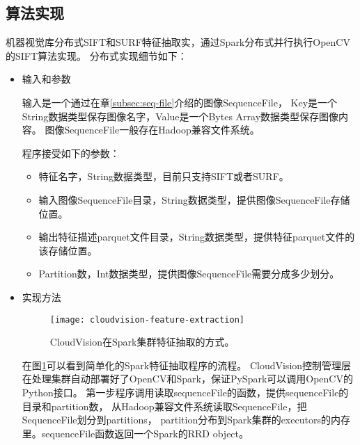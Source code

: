 \subsection*{算法实现}
机器视觉库分布式SIFT和SURF特征抽取实，通过Spark分布式并行执行OpenCV的SIFT算法实现。
分布式实现细节如下：
\begin{itemize}
  \item 输入和参数

        输入是一个通过在章\ref{subsec:seq-file}介绍的图像SequenceFile，
        Key是一个String数据类型保存图像名字，Value是一个Bytes Array数据类型保存图像内容。
        图像SequenceFile一般存在Hadoop兼容文件系统。

        程序接受如下的参数：
        \begin{itemize}
            \item 特征名字，String数据类型，目前只支持SIFT或者SURF。
            \item 输入图像SequenceFile目录，String数据类型，提供图像SequenceFile存储位置。
            \item 输出特征描述parquet文件目录，String数据类型，提供特征parquet文件的该存储位置。
            \item Partition数，Int数据类型，提供图像SequenceFile需要分成多少划分。
        \end{itemize}

  \item 实现方法

        \begin{figure}[h]
          \centering
            \texttt{[image: cloudvision-feature-extraction]}
          \caption{CloudVision在Spark集群特征抽取的方式。}
          \label{fig:cloudvision-feature-extraction}
        \end{figure}

        在图\ref{fig:cloudvision-feature-extraction}可以看到简单化的Spark特征抽取程序的流程。
        CloudVision控制管理层在处理集群自动部署好了OpenCV和Spark，保证PySpark可以调用OpenCV的
        Python接口。
        第一步程序调用读取sequenceFile的函数，提供sequenceFile的目录和partition数，
        从Hadoop兼容文件系统读取SequenceFile，把SequenceFile划分到partitions，
        partition分布到Spark集群的executors的内存里。sequenceFile函数返回一个Spark的RRD object。


\end{itemize}
